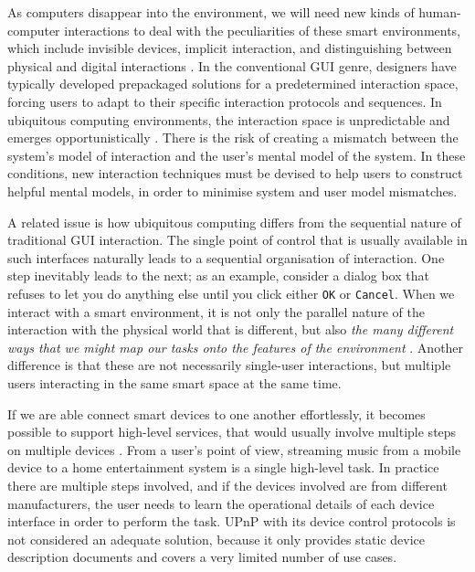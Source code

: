 As computers disappear into the environment, we will need new kinds of human-computer interactions to deal with the peculiarities of these smart environments, which include invisible devices, implicit interaction, and distinguishing between physical and digital interactions \cite{Ye2007}. In the conventional \ac{GUI} genre, designers have typically developed prepackaged solutions for a predetermined interaction space, forcing users to adapt to their specific interaction protocols and sequences. In ubiquitous computing environments, the interaction space is unpredictable and emerges opportunistically \cite{Coutaz2005a}. There is the risk of creating a mismatch between the system's model of interaction and the user's mental model of the system. In these conditions, new interaction techniques must be devised to help users to construct helpful mental models, in order to minimise system and user model mismatches.

A related issue is how ubiquitous computing differs from the sequential nature of traditional \ac{GUI} interaction. The single point of control that is usually available in such interfaces naturally leads to a sequential organisation of interaction. One step inevitably leads to the next; as an example, consider a dialog box that refuses to let you do anything else until you click either \texttt{OK} or \texttt{Cancel}. When we interact with a smart environment, it is not only the parallel nature of the interaction with the physical world that is different, but also \emph{the many different ways that we might map our tasks onto the features of the environment} \cite{Dourish2004}. Another difference is that these are not necessarily single-user interactions, but multiple users interacting in the same smart space at the same time.

If we are able connect smart devices to one another effortlessly, it becomes possible to support high-level services, that would usually involve multiple steps on multiple devices \cite{Rich2009}. From a user's point of view, streaming music from a mobile device to a home entertainment system is a single high-level task. In practice there are multiple steps involved, and if the devices involved are from different manufacturers, the user needs to learn the operational details of each device interface in order to perform the task. \ac{UPnP} with its device control protocols \cite{uPnPDCP} is not considered an adequate solution, because it only provides static device description documents and covers a very limited number of use cases.

